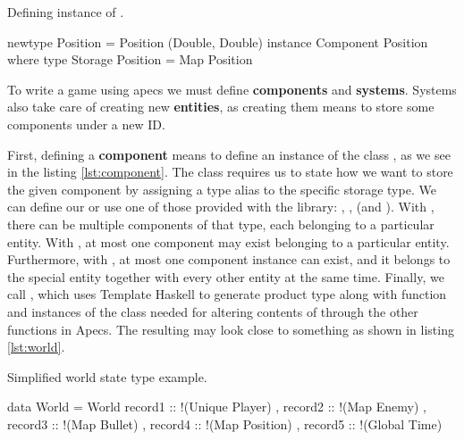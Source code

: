 \documentclass[
  digital, %
  color,   %
  table,   %
  oneside, %
  lof,     %
  lot,     %
]{fithesis3}
\begin{document}
\begin{listing}[H]
\caption{Defining instance of .}
\begin{haskell}
newtype Position = Position (Double, Double)
instance Component Position where
    type Storage Position = Map Position
\end{haskell}
\label{lst:component}
\end{listing}


To write a game using apecs we must define \textbf{components} and \textbf{systems}.
Systems also take care of creating new \textbf{entities},
as creating them means to store some components under a new ID.

First, defining a \textbf{component} means to define an instance of the class
, as we see in the listing \ref{lst:component}.
The  class
requires us to state how we want to store the given component
by assigning a type alias to the specific storage type.
We can define our  or use one of those provided
with the library: , ,  (and ).
With , there can be multiple components of that type,
each belonging to a particular entity.
With , at most one component may exist
belonging to a particular entity. Furthermore,
with , at most one component instance can exist,
and it belongs to the special  entity together
with every other entity at the same time. Finally, we call ,
which uses Template Haskell to generate  product type
along with  function and instances of the 
class needed for altering contents of  through
the other functions in Apecs. The resulting 
may look close to something as shown in listing \ref{lst:world}.

\begin{listing}[H]
\caption{Simplified world state type example.}
\begin{haskell}
data World =
    World
    { record1 :: !(Unique Player)
    , record2 :: !(Map Enemy)
    , record3 :: !(Map Bullet)
    , record4 :: !(Map Position)
    , record5 :: !(Global Time)
    }
\end{haskell}
\label{lst:world}
\end{listing}
\end{document}
